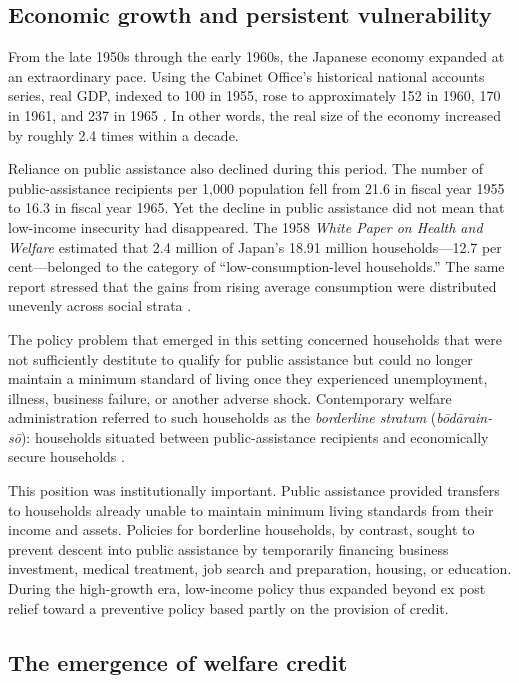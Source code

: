 \documentclass[12pt,a4paper]{article}
\begin{document}
\subsection{Economic growth and persistent vulnerability}

From the late 1950s through the early 1960s, the Japanese economy expanded at an extraordinary pace. Using the Cabinet Office's historical national accounts series, real GDP, indexed to 100 in 1955, rose to approximately 152 in 1960, 170 in 1961, and 237 in 1965 \citep{CabinetOffice2000}. In other words, the real size of the economy increased by roughly 2.4 times within a decade.

Reliance on public assistance also declined during this period. The number of public-assistance recipients per 1,000 population fell from 21.6 in fiscal year 1955 to 16.3 in fiscal year 1965. Yet the decline in public assistance did not mean that low-income insecurity had disappeared. The 1958 \emph{White Paper on Health and Welfare} estimated that 2.4 million of Japan's 18.91 million households---12.7 per cent---belonged to the category of ``low-consumption-level households.'' The same report stressed that the gains from rising average consumption were distributed unevenly across social strata \citep{MinistryofHealthandWelfare1958}.

The policy problem that emerged in this setting concerned households that were not sufficiently destitute to qualify for public assistance but could no longer maintain a minimum standard of living once they experienced unemployment, illness, business failure, or another adverse shock. Contemporary welfare administration referred to such households as the \emph{borderline stratum} (\emph{b\=odārain-s\=o}): households situated between public-assistance recipients and economically secure households \citep{Sakai2023}.

This position was institutionally important. Public assistance provided transfers to households already unable to maintain minimum living standards from their income and assets. Policies for borderline households, by contrast, sought to prevent descent into public assistance by temporarily financing business investment, medical treatment, job search and preparation, housing, or education. During the high-growth era, low-income policy thus expanded beyond ex post relief toward a preventive policy based partly on the provision of credit.

\subsection{The emergence of welfare credit}
\end{document}
